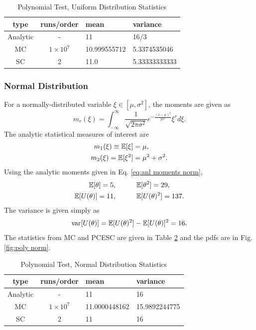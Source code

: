 \begin{table}
\begin{center}
\begin{tabular}{c c|l l}
type & runs/order & mean & variance \\ \hline
Analytic & - & 11 & 16/3 \\
MC & $1\times10^7$ & 10.999555712 & 5.3374535046 \\
SC & 2 & 11.0 & 5.33333333333 \\
\end{tabular}
\end{center}
\caption{Polynomial Test, Uniform Distribution Statistics}
\label{tab:poly uniform}
\end{table}

\subsubsection{Normal Distribution}
For a normally-distributed variable $\xi\in[\mu,\sigma^2]$, the moments are given as
\begin{equation}
m_r(\xi)=\int_{-\infty}^\infty \frac{1}{\sqrt{2\pi\sigma^2}}e^{-\frac{(x-\mu)^2}{2\sigma^2}}\xi^r d\xi.
\end{equation}
The analytic statistical measures of interest are
\begin{align}\label{eq:anl moments norm}
m_1(\xi)\equiv\mathbb{E}[ \xi]&=\mu,\\
m_2(\xi)=\mathbb{E}[ \xi^2]&=\mu^2+\sigma^2.
\end{align}
Using the analytic moments given in Eq. \ref{eq:anl moments norm},
\begin{align}
\mathbb{E}[ \theta] = 5, &\hspace{30pt}\mathbb{E}[ \theta^2]=29,\\
\mathbb{E}[ U(\theta)]=11, &\hspace{30pt}\mathbb{E}[ U(\theta)^2]=137.
\end{align}
The variance is given simply as
\begin{equation}
\text{var}[U(\theta)]=\mathbb{E}[ U(\theta)^2]-\mathbb{E}[ U(\theta)]^2=16.
\end{equation}
The statistics from MC and PCESC are given in Table \ref{tab:poly normal} and the pdfs are in Fig. \ref{fig:poly norm}.

\begin{table}
\begin{center}
\begin{tabular}{c c|l l}
type & runs/order & mean & variance \\ \hline
Analytic & - & 11 & 16 \\
MC & $1\times10^7$ & 11.0000448162 & 15.9892244775 \\
SC & 2 & 11 & 16 \\
\end{tabular}
\end{center}
\caption{Polynomial Test, Normal Distribution Statistics}
\label{tab:poly normal}
\end{table}

